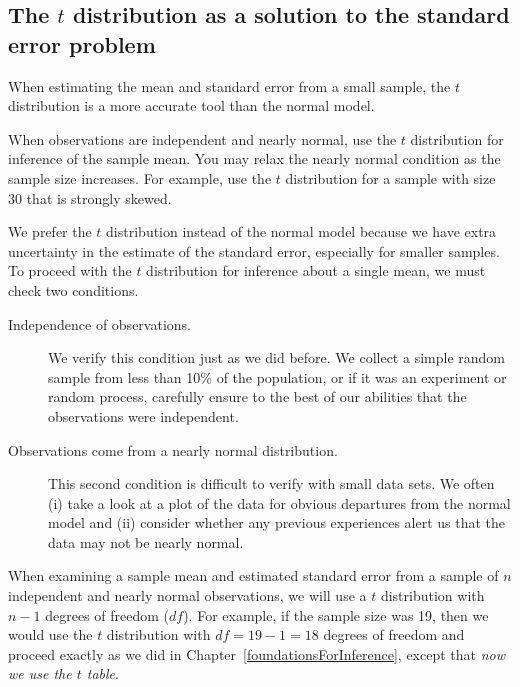\subsection{The $t$ distribution as a solution to the standard error problem}
\label{tDistSolutionToSEProblem}

When estimating the mean and standard error from a small sample, the $t$ distribution is a more accurate tool than the normal model.

\begin{tipBox}{
When observations are independent and nearly normal, use the $t$ distribution for inference of the sample mean. You may relax the nearly normal condition as the sample size increases. For example, use the $t$ distribution for a sample with size 30 that is strongly skewed.
}
\end{tipBox}

We prefer the $t$ distribution instead of the normal model because we have extra uncertainty in the estimate of the standard error, especially for smaller samples. To proceed with the $t$ distribution for inference about a single mean, we must check two conditions.
\begin{description}
\item[Independence of observations.] We verify this condition just as we did before. We collect a simple random sample from less than 10\% of the population, or if it was an experiment or random process, carefully ensure to the best of our abilities that the observations were independent.
\item[Observations come from a nearly normal distribution.] This second condition is difficult to verify with small data sets. We often (i) take a look at a plot of the data for obvious departures from the normal model and (ii) consider whether any previous experiences alert us that the data may not be nearly normal.
\end{description}
When examining a sample mean and estimated standard error from a sample of $n$ independent and nearly normal observations, we will use a $t$ distribution with $n-1$ degrees of freedom ($df$). For example, if the sample size was 19, then we would use the $t$ distribution with $df=19-1=18$ degrees of freedom and proceed exactly as we did in Chapter~\ref{foundationsForInference}, except that \emph{now we use the $t$ table}.

